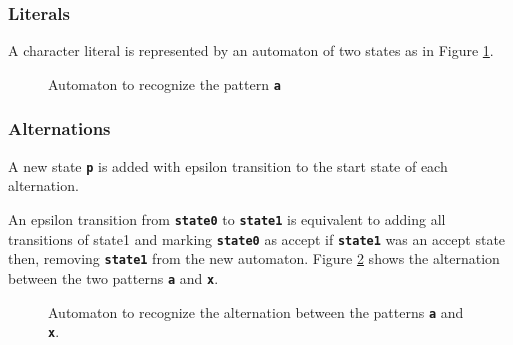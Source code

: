 \subsubsection{Literals}
A character literal is represented by an automaton of two states as in Figure \ref{fig:auto1}.

\begin{figure}[htpb]
\centering
{}
\caption{Automaton to recognize the pattern \texttt{\textbf{a}}}
\label{fig:auto1}
\end{figure}


\subsubsection{Alternations}\label{epsremoval}
A new state \texttt{\textbf{p}} is added with epsilon transition to the start state of each alternation.

An epsilon transition from \texttt{\textbf{state0}} to  \texttt{\textbf{state1}} is equivalent to adding all transitions of state1 and marking  \texttt{\textbf{state0}} as accept if  \texttt{\textbf{state1}} was an accept state then, removing  \texttt{\textbf{state1}} from the new automaton. Figure \ref{fig:auto2} shows the alternation between the two patterns \texttt{\textbf{a}} and \texttt{\textbf{x}}.

\begin{figure}[htpb]
\centering
{}
\caption{Automaton to recognize the alternation between the patterns \texttt{\textbf{a}} and \texttt{\textbf{x}}.}
\label{fig:auto2}
\end{figure}

